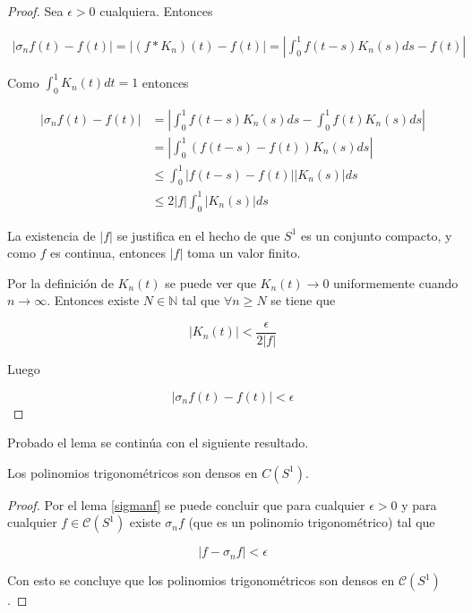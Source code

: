 \begin{proof}
	Sea $\epsilon >0$ cualquiera. Entonces
	
	\begin{multline}
		|\sigma_n f(t) - f(t)| = \left| (f * K_n)(t) - f(t)  \right| = \left| \int_{0}^{1} f(t-s) K_n(s) ds - f(t) \right|
	\end{multline}
	
	Como $\int_{0}^{1} K_n(t)dt = 1$ entonces
	
	\begin{align}
		|\sigma_n f(t) - f(t)| &= \left| \int_{0}^{1} f(t-s) K_n(s)ds - \int_{0}^{1} f(t) K_n(s)ds \right|\\
		&= \left| \int_{0}^{1} (f(t-s)-f(t)) K_n(s)ds \right|\\
		&\leq \int_{0}^{1} | f(t-s)-f(t) | |K_n(s)| ds\\
		&\leq 2|f| \int_{0}^{1} |K_n(s)|ds
	\end{align}
	
	La existencia de $|f|$ se justifica en el hecho de que $S^1$ es un conjunto compacto, y como $f$ es continua, entonces $|f|$ toma un valor finito.
	
	Por la definición de $K_n(t)$ se puede ver que $K_n(t) \rightarrow 0$ uniformemente cuando $n \rightarrow \infty$. Entonces existe $N \in \mathbb{N}$ tal que $\forall n \geq N$ se tiene que
	
	\begin{equation}
		|K_n(t)| < \frac{\epsilon}{2|f|}
	\end{equation}
	
	Luego
	
	\begin{equation}
		|\sigma_n f(t) - f(t)| < \epsilon
	\end{equation}
\end{proof}

Probado el lema se continúa con el siguiente resultado.

\begin{teorema}
	Los polinomios trigonométricos son densos en $C(S^1)$.
\end{teorema}

\begin{proof}
	Por el lema \ref{sigmanf} se puede concluir que para cualquier $\epsilon > 0$ y para cualquier $f \in \mathcal{C}(S^1)$ existe $\sigma_n f$ (que es un polinomio trigonométrico) tal que
	
	\begin{equation}
		|f - \sigma_n f| < \epsilon
	\end{equation}
	
	Con esto se concluye que los polinomios trigonométricos son densos en $\mathcal{C}(S^1)$.
\end{proof}
